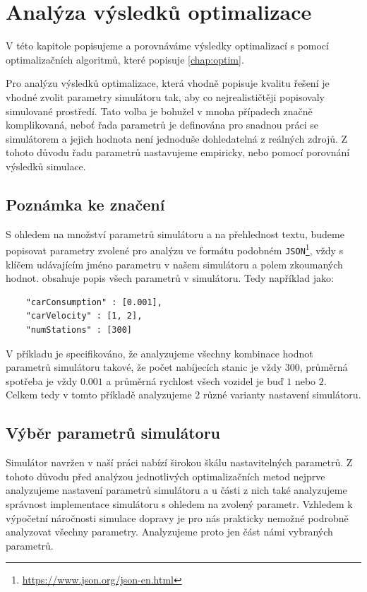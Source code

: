 \chapter{Analýza výsledků optimalizace}
\label{chap:analysis}

V této kapitole popisujeme a porovnáváme výsledky optimalizací s pomocí
optimalizačních algoritmů, které popisuje \cref{chap:optim}. 

Pro analýzu výsledků optimalizace, která vhodně popisuje kvalitu řešení je
vhodné zvolit parametry simulátoru tak, aby co nejrealističtěji popisovaly 
simulované prostředí. Tato volba je bohužel v mnoha případech značně komplikovaná,
neboť řada parametrů je definována pro snadnou práci se simulátorem a jejich 
hodnota není jednoduše dohledatelná z reálných zdrojů. Z tohoto důvodu
řadu parametrů nastavujeme empiricky, nebo pomocí porovnání výsledků simulace.


\section{Poznámka ke značení}
S ohledem na množství parametrů simulátoru a na přehlednost textu, budeme 
popisovat parametry zvolené pro analýzu ve formátu podobném
\texttt{JSON}\footnote{\url{https://www.json.org/json-en.html}}, vždy s
klíčem udávajícím jméno parametru v našem simulátoru a polem zkoumaných hodnot.
 obsahuje popis všech parametrů v
simulátoru.
Tedy například jako:

\begin{verbatim}
    "carConsumption" : [0.001],
    "carVelocity" : [1, 2],
    "numStations" : [300]
\end{verbatim}

V příkladu je specifikováno, že analyzujeme všechny kombinace hodnot parametrů
simulátoru takové, že počet nabíjecích stanic je vždy $300$, průměrná spotřeba 
je vždy $0.001$ a průměrná rychlost všech vozidel je buď $1$ nebo $2$. Celkem
tedy v tomto příkladě analyzujeme 2 různé varianty nastavení simulátoru.


\section{Výběr parametrů simulátoru}
\label{sec:vyber_parametru}

Simulátor navržen v naší práci nabízí širokou škálu nastavitelných parametrů.
Z tohoto důvodu před analýzou jednotlivých optimalizačních metod nejprve 
analyzujeme nastavení parametrů simulátoru a u části z nich také analyzujeme 
správnost implementace simulátoru s ohledem na zvolený parametr.
Vzhledem k výpočetní náročnosti simulace dopravy je pro nás prakticky nemožné
podrobně analyzovat všechny parametry. Analyzujeme proto jen část námi vybraných 
parametrů.

